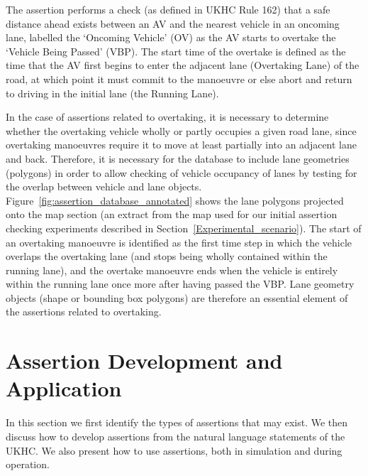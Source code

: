 The assertion performs a check (as defined in UKHC Rule 162) that a safe distance ahead exists between an AV and the nearest vehicle in an oncoming lane, labelled the `Oncoming Vehicle' (OV) as the AV starts to overtake the `Vehicle Being Passed' (VBP). The start time of the overtake is defined as the time that the AV first begins to enter the adjacent lane (Overtaking Lane) of the road, at which point it must commit to the manoeuvre or else abort and return to driving in the initial lane (the Running Lane).

In the case of assertions related to overtaking, it is necessary to determine whether the overtaking vehicle wholly or partly occupies a given road lane, since overtaking manoeuvres require it to move at least partially into an adjacent lane and back. Therefore, it is necessary for the database to include lane geometries (polygons) in order to allow checking of vehicle occupancy of lanes by testing for the overlap between vehicle and lane objects. Figure~\ref{fig:assertion_database_annotated} shows the lane polygons projected onto the map section (an extract from the map used for our initial assertion checking experiments described in Section~\ref{Experimental_scenario}). The start of an overtaking manoeuvre is identified as the first time step in which the vehicle overlaps the overtaking lane (and stops being wholly contained within the running lane), and the overtake manoeuvre ends when the vehicle is entirely within the running lane once more after having passed the VBP. Lane geometry objects (shape or bounding box polygons) are therefore an essential element of the assertions related to overtaking.

\section{Assertion Development and Application}\label{Use_of_assertions}
In this section we first identify the types of assertions that may exist. We then discuss how to develop assertions from the natural language statements of the UKHC. We also present how to use assertions, both in simulation and during operation.

